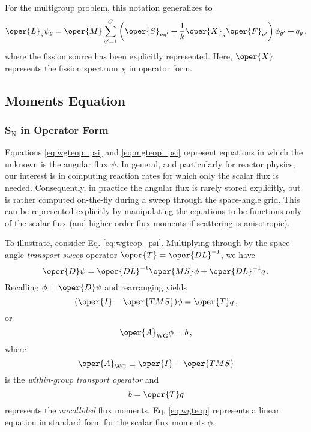 For the multigroup problem, this notation generalizes to 
\begin{equation}
  \oper{L}_g\psi_g =  \oper{M} \sum_{g'=1}^G 
         \left (
           \oper{S}_{gg'} + 
           \frac{1}{k}\oper{X}_{g} \oper{F}_{g'} 
         \right )\phi_{g'} + q_g \, ,
\label{eq:mgteop_psi}
\end{equation}
where the fission source has been explicitly represented.  Here,
$\oper{X}$ represents the fission spectrum $\chi$ in operator form.

\subsection{Moments Equation}

\subsubsection{S$_{\text{N}}$ in Operator Form}

Equations \ref{eq:wgteop_psi} and \ref{eq:mgteop_psi} represent 
equations in which the unknown is the angular flux $\psi$.  In 
general, and particularly for reactor physics, our interest is in
computing reaction rates for which only the scalar flux is needed.  
Consequently, in practice the angular flux is rarely stored explicitly, 
but is rather computed on-the-fly during a sweep through the space-angle 
grid.  This
can be represented explicitly by manipulating the equations to be functions
only of the scalar flux (and higher order flux moments if scattering 
is anisotropic).  

To illustrate, consider Eq. \ref{eq:wgteop_psi}.  Multiplying
through by the space-angle \emph{transport sweep} 
operator $\oper{T} = \oper{DL}^{-1}$, we have
\begin{equation}
 \oper{D}\psi = 
    \oper{DL}^{-1} \oper{MS} \phi + \oper{DL}^{-1}q \, .
\end{equation}
Recalling $\phi = \oper{D}\psi$ and rearranging yields 
\begin{equation}
 (\oper{I} - \oper{TMS} ) \phi =  \oper{T}q \, ,
\label{eq:wgteop}
\end{equation}
or 
\begin{equation}
  \oper{A}_{\text{WG}} \phi = b \, ,
\end{equation}
where
\begin{equation}
 \oper{A}_{\text{WG}} \equiv \oper{I} - \oper{TMS}
\end{equation}
is the \emph{within-group transport operator} and
\begin{equation}
 b = \oper{T}q
\end{equation}
represents the \emph{uncollided} flux moments.  Eq. \ref{eq:wgteop} represents
a linear equation in standard form for the scalar flux moments $\phi$.  

